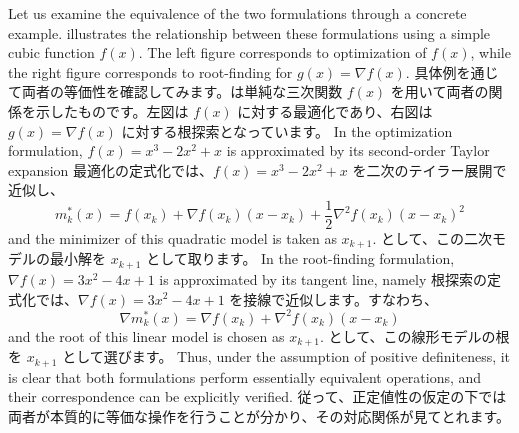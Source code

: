 \documentclass[0_main]{subfiles}
\begin{document}
\ifEn
    Let us examine the equivalence of the two formulations through a concrete example.
     illustrates the relationship between these formulations using a simple cubic function $f(x)$.
    The left figure corresponds to optimization of $f(x)$, while the right figure corresponds to root-finding for $g(x) = \nabla f(x)$.
\else
    具体例を通じて両者の等価性を確認してみます。は単純な三次関数 $f(x)$ を用いて両者の関係を示したものです。左図は $f(x)$ に対する最適化であり、右図は $g(x) = \nabla f(x)$ に対する根探索となっています。
\fi
\ifEn
    In the optimization formulation, $f(x) = x^3 - 2x^2 + x$ is approximated by its second-order Taylor expansion
\else
    最適化の定式化では、$f(x) = x^3 - 2x^2 + x$ を二次のテイラー展開で近似し、
\fi
\begin{equation*}
    m_k^*(x) = f(x_k) + \nabla f(x_k)(x - x_k) + \frac{1}{2}\nabla^2 f(x_k)(x - x_k)^2
\end{equation*}
\ifEn
    and the minimizer of this quadratic model is taken as $x_{k+1}$.
\else
    として、この二次モデルの最小解を $x_{k+1}$ として取ります。
\fi
\ifEn
    In the root-finding formulation, $\nabla f(x) = 3x^2 - 4x + 1$ is approximated by its tangent line, namely
\else
    根探索の定式化では、$\nabla f(x) = 3x^2 - 4x + 1$ を接線で近似します。すなわち、
\fi
\begin{equation*}
    \nabla m_k^*(x) = \nabla f(x_k) + \nabla^2 f(x_k)(x - x_k)
\end{equation*}
\ifEn
    and the root of this linear model is chosen as $x_{k+1}$.
\else
    として、この線形モデルの根を $x_{k+1}$ として選びます。
\fi
\ifEn
    Thus, under the assumption of positive definiteness, it is clear that both formulations perform essentially equivalent operations, and their correspondence can be explicitly verified.
\else
    従って、正定値性の仮定の下では両者が本質的に等価な操作を行うことが分かり、その対応関係が見てとれます。
\fi

\ifSubfilesClassLoaded{
    
    
}{}
\end{document}
